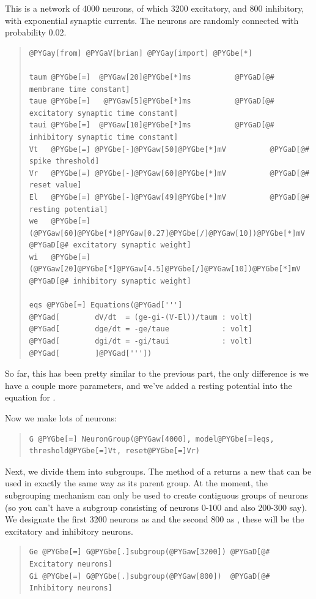 \documentclass[letterpaper,10pt,english]{manual}
\begin{document}
This is a network of 4000 neurons, of which 3200 excitatory, and 800 inhibitory, with
exponential synaptic currents. The neurons are randomly connected with probability 0.02.
\begin{quote}

\begin{Verbatim}[commandchars=@\[\]]
@PYGay[from] @PYGaV[brian] @PYGay[import] @PYGbe[*]

taum @PYGbe[=]  @PYGaw[20]@PYGbe[*]ms          @PYGaD[@# membrane time constant]
taue @PYGbe[=]   @PYGaw[5]@PYGbe[*]ms          @PYGaD[@# excitatory synaptic time constant]
taui @PYGbe[=]  @PYGaw[10]@PYGbe[*]ms          @PYGaD[@# inhibitory synaptic time constant]
Vt   @PYGbe[=] @PYGbe[-]@PYGaw[50]@PYGbe[*]mV          @PYGaD[@# spike threshold]
Vr   @PYGbe[=] @PYGbe[-]@PYGaw[60]@PYGbe[*]mV          @PYGaD[@# reset value]
El   @PYGbe[=] @PYGbe[-]@PYGaw[49]@PYGbe[*]mV          @PYGaD[@# resting potential]
we   @PYGbe[=] (@PYGaw[60]@PYGbe[*]@PYGaw[0.27]@PYGbe[/]@PYGaw[10])@PYGbe[*]mV @PYGaD[@# excitatory synaptic weight]
wi   @PYGbe[=]  (@PYGaw[20]@PYGbe[*]@PYGaw[4.5]@PYGbe[/]@PYGaw[10])@PYGbe[*]mV @PYGaD[@# inhibitory synaptic weight]

eqs @PYGbe[=] Equations(@PYGad[''']
@PYGad[        dV/dt  = (ge-gi-(V-El))/taum : volt]
@PYGad[        dge/dt = -ge/taue            : volt]
@PYGad[        dgi/dt = -gi/taui            : volt]
@PYGad[        ]@PYGad['''])
\end{Verbatim}
\end{quote}

So far, this has been pretty similar to the previous part, the only
difference is we have a couple more parameters, and we've added a
resting potential  into the equation for .

Now we make lots of neurons:
\begin{quote}

\begin{Verbatim}[commandchars=@\[\]]
G @PYGbe[=] NeuronGroup(@PYGaw[4000], model@PYGbe[=]eqs, threshold@PYGbe[=]Vt, reset@PYGbe[=]Vr)
\end{Verbatim}
\end{quote}

Next, we divide them into subgroups. The \hyperlink{brian.NeuronGroup.subgroup}{} method of a
\hyperlink{brian.NeuronGroup}{} returns a new \hyperlink{brian.NeuronGroup}{} that can be used in
exactly the same way as its parent group. At the moment, the
subgrouping mechanism can only be used to create contiguous
groups of neurons (so you can't have a subgroup consisting
of neurons 0-100 and also 200-300 say). We designate the
first 3200 neurons as  and the second 800 as , these
will be the excitatory and inhibitory neurons.
\begin{quote}

\begin{Verbatim}[commandchars=@\[\]]
Ge @PYGbe[=] G@PYGbe[.]subgroup(@PYGaw[3200]) @PYGaD[@# Excitatory neurons]
Gi @PYGbe[=] G@PYGbe[.]subgroup(@PYGaw[800])  @PYGaD[@# Inhibitory neurons]
\end{Verbatim}
\end{quote}
\end{document}
